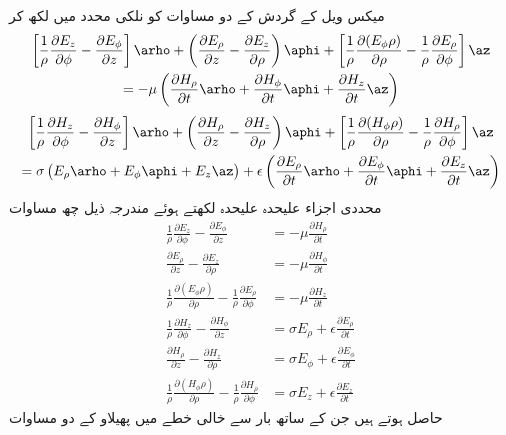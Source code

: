 میکس ویل کے  گردش کے دو مساوات  کو نلکی محدد میں لکھ کر
\begin{multline*}
\left[\frac{1}{\rho}\frac{\partial E_z}{\partial \phi} -\frac{\partial E_{\phi}}{\partial z}\right]\arho+\left(\frac{\partial E_\rho}{\partial z}-\frac{\partial E_z}{\partial \rho} \right)\aphi+\left[\frac{1}{\rho}\frac{\partial (E_{\phi}\rho )}{\partial \rho}-\frac{1}{\rho}\frac{\partial E_{\rho}}{\partial \phi}\right]\az \\
=-\mu \left(\frac{\partial H_{\rho}}{\partial t} \arho+\frac{\partial H_{\phi}}{\partial t}\aphi+\frac{\partial H_{z}}{\partial t} \az \right)
\end{multline*}
%
\begin{multline*}
\left[\frac{1}{\rho}\frac{\partial H_z}{\partial \phi} -\frac{\partial H_{\phi}}{\partial z}\right]\arho+\left(\frac{\partial H_\rho}{\partial z}-\frac{\partial H_z}{\partial \rho} \right)\aphi+\left[\frac{1}{\rho}\frac{\partial (H_{\phi}\rho )}{\partial \rho}-\frac{1}{\rho}\frac{\partial H_{\rho}}{\partial \phi}\right]\az \\
=\sigma\left(E_{\rho}\arho+E_{\phi}\aphi+E_z \az \right)+\epsilon \left(\frac{\partial E_{\rho}}{\partial t}\arho+\frac{\partial E_{\phi}}{\partial t} \aphi+\frac{\partial E_{z}}{\partial t} \az\right)
\end{multline*} 
محددی اجزاء علیحدہ علیحدہ لکھتے ہوئے مندرجہ ذیل چھ مساوات
\begin{align}
\frac{1}{\rho}\frac{\partial E_z}{\partial \phi} -\frac{\partial E_{\phi}}{\partial z}&=-\mu \frac{\partial H_{\rho}}{\partial t} \label{مساوات_مویج_نلکی_الف}\\
\frac{\partial E_\rho}{\partial z}-\frac{\partial E_z}{\partial \rho}&=-\mu\frac{\partial H_{\phi}}{\partial t}\\
\frac{1}{\rho}\frac{\partial (E_{\phi}\rho )}{\partial \rho}-\frac{1}{\rho}\frac{\partial E_{\rho}}{\partial \phi} &=-\mu \frac{\partial H_{z}}{\partial t}\\
\frac{1}{\rho}\frac{\partial H_z}{\partial \phi} -\frac{\partial H_{\phi}}{\partial z}&=\sigma E_{\rho}+\epsilon \frac{\partial E_{\rho}}{\partial t}\\
\frac{\partial H_\rho}{\partial z}-\frac{\partial H_z}{\partial \rho}&=\sigma E_{\phi}+\epsilon \frac{\partial E_{\phi}}{\partial t} \\
\frac{1}{\rho}\frac{\partial (H_{\phi}\rho )}{\partial \rho}-\frac{1}{\rho}\frac{\partial H_{\rho}}{\partial \phi}&=\sigma E_z +\epsilon\frac{\partial E_{z}}{\partial t} 
\end{align}
حاصل ہوتے ہیں جن کے ساتھ بار سے خالی  خطے میں پھیلاو کے دو مساوات


